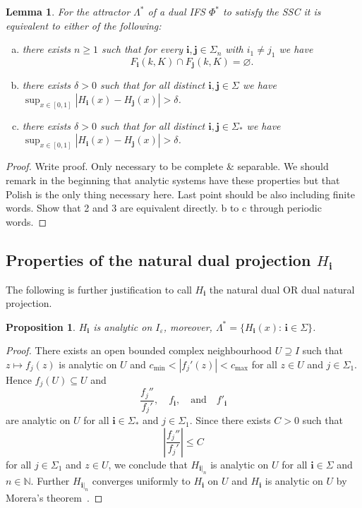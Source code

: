 \documentclass[12pt,]{article}
\newtheorem{proposition}[theorem]{Proposition}
\newtheorem{lemma}[theorem]{Lemma}
\theoremstyle{definition}
\theoremstyle{remark}
\renewcommand{\Bbb}[1]{\mathbb{#1}}
\newcommand{\bbN}{{\Bbb N}}         %
\newcommand{\0}{\mathbf{0}}
\newcommand{\eps}{\varepsilon}
\newcommand{\bi}{\mathbf{i}}
\newcommand{\bj}{\mathbf{j}}
\begin{document}
{\begin{lemma}\label{lem:SSCEequiv}
For the attractor $\Lambda^*$ of a dual IFS $\Phi^*$ to satisfy the SSC it is equivalent to either of the following: 
\begin{enumerate}[a)]
\item there exists $n\geq1$ such that for every $\bi,\bj\in\Sigma_n$  with $i_1\neq j_1$ we have
\begin{equation*}
	F_{\bi}(k,K)\cap F_{\bj}(k,K)=\varnothing. 
\end{equation*}
\item there exists $\delta>0$ such that for all distinct $\bi,\bj \in\Sigma$ we have
  $\sup_{x\in[0,1]} |H_{\bi}(x) - H_{\bj}(x)| > \delta$.
\item there exists $\delta>0$ such that for all distinct $\bi,\bj \in\Sigma_*$ we have
  $\sup_{x\in[0,1]} |H_{\bi}(x) - H_{\bj}(x)| > \delta$.
\end{enumerate}
\end{lemma}
\begin{proof}
  {\color{red}Write proof. Only necessary to be complete \& separable. We should remark in the
  beginning that analytic systems have these properties but that Polish is the only thing necessary
here. Last point should be also including finite words. Show that 2 and 3 are equivalent directly.
b to c through periodic words.}
\end{proof}


\subsection{Properties of the natural dual projection \texorpdfstring{$H_{\bi}$}{H}}

The following is further justification to call $H_{\bi}$ the {\color{red}natural dual OR dual natural} projection.
\begin{proposition}\label{thm:H_iAnalytic}
$H_{\bi}$ is analytic on $I_{\eps}$, moreover, $\Lambda^*=\{H_{\bi}(x):\, \bi\in\Sigma\}$.
\end{proposition}
\begin{proof}
There exists an open bounded complex neighbourhood $U \supseteq I$ such that
$z\mapsto f_j(z)$ is analytic on $U$ and $c_{\min}<|f_j'(z)|<c_{\max}$ for all $z\in U$ and $j\in\Sigma_1$.
Hence $f_j(U) \subseteq U$ and
\[
\frac{f_j''}{f_j'},\quad f_{\bi}, \quad\text{and} \quad f'_{\bi}
\]
are analytic on $U$ for all $\bi\in\Sigma_*$ and $j\in\Sigma_1$.
Since there exists $C>0$ such that
\[
\left|\frac{f_j''}{f_j'}\right| \leq C
\]
for all $j\in\Sigma_1$ and $z\in U$, we conclude that $H_{\bi|_n}$ is analytic on $U$ for
all $\bi\in\Sigma$ and $n\in\bbN$. Further $H_{\bi|_n}$ converges uniformly to $H_{\bi}$ on $U$
and $H_{\bi}$ is analytic on $U$ by Morera's theorem~\cite[Theorem 10.17]{Rudin_AnalysisBook}.


\end{proof}}
\end{document}
